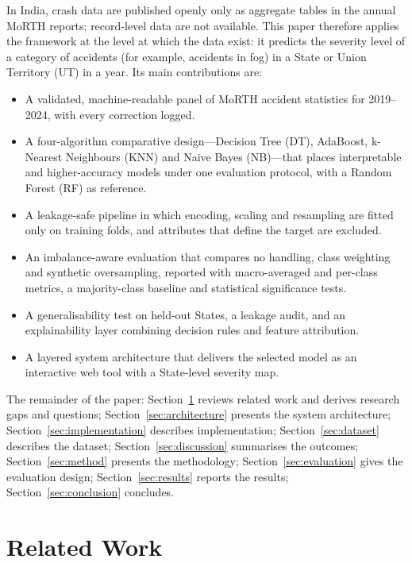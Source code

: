 \documentclass[conference]{IEEEtran}
\begin{document}
In India, crash data are published openly only as aggregate tables in the annual MoRTH reports; record-level data are not available. This paper therefore applies the framework at the level at which the data exist: it predicts the severity level of a category of accidents (for example, accidents in fog) in a State or Union Territory (UT) in a year. Its main contributions are:
\begin{itemize}
\item A validated, machine-readable panel of MoRTH accident statistics for 2019--2024, with every correction logged.
\item A four-algorithm comparative design---Decision Tree (DT), AdaBoost, k-Nearest Neighbours (KNN) and Naive Bayes (NB)---that places interpretable and higher-accuracy models under one evaluation protocol, with a Random Forest (RF) as reference.
\item A leakage-safe pipeline in which encoding, scaling and resampling are fitted only on training folds, and attributes that define the target are excluded.
\item An imbalance-aware evaluation that compares no handling, class weighting and synthetic oversampling, reported with macro-averaged and per-class metrics, a majority-class baseline and statistical significance tests.
\item A generalisability test on held-out States, a leakage audit, and an explainability layer combining decision rules and feature attribution.
\item A layered system architecture that delivers the selected model as an interactive web tool with a State-level severity map.
\end{itemize}

The remainder of the paper: Section~\ref{sec:related} reviews related work and derives research gaps and questions; Section~\ref{sec:architecture} presents the system architecture; Section~\ref{sec:implementation} describes implementation; Section~\ref{sec:dataset} describes the dataset; Section~\ref{sec:discussion} summarises the outcomes; Section~\ref{sec:method} presents the methodology; Section~\ref{sec:evaluation} gives the evaluation design; Section~\ref{sec:results} reports the results; Section~\ref{sec:conclusion} concludes.

\section{Related Work}
\label{sec:related}
\end{document}
